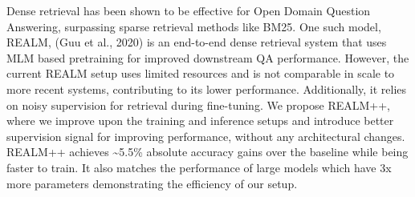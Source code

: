 Dense retrieval has been shown to be effective for Open Domain Question Answering, surpassing sparse retrieval methods like BM25. One such model, REALM, (Guu et al., 2020) is an end-to-end dense retrieval system that uses MLM based pretraining for improved downstream QA performance. However, the current REALM setup uses limited resources and is not comparable in scale to more recent systems, contributing to its lower performance. Additionally, it relies on noisy supervision for retrieval during fine-tuning. We propose REALM++, where we improve upon the training and inference setups and introduce better supervision signal for improving performance, without any architectural changes. REALM++ achieves {\textasciitilde}5.5\% absolute accuracy gains over the baseline while being faster to train. It also matches the performance of large models which have 3x more parameters demonstrating the efficiency of our setup.
